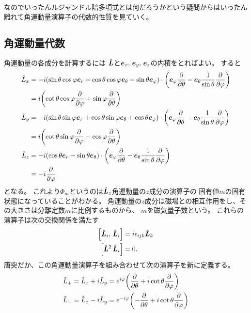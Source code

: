 \documentclass[../../master.tex]{subfiles}
\begin{document}
なのでいったんルジャンドル陪多項式とは何だろうかという疑問からはいったん離れて角運動量演算子の代数的性質を見ていく。

\subsection{角運動量代数}

角運動量の各成分を計算するには
\(\hat{\vb*{L}}\)と\(\vb*{e}_x,\,\vb*{e}_y,\,\vb*{e}_z\)の内積をとればよい。
すると
\begin{align}
	\hat{L}_x
	 & = -i(\sin\theta\cos\varphi \vb*{e}_r + \cos\theta\cos\varphi \vb*{e}_\theta - \sin\theta \vb*{e}_\varphi) \cdot
	\qty(\vb*{e}_{\varphi}\pdv{\theta}-\vb*{e}_{\theta}\frac{1}{\sin\theta}\pdv{\varphi}) \notag                       \\
	 & = i\qty(\cot\theta\cos\varphi\pdv{\varphi}+\sin\varphi\pdv{\theta})                                             \\
	\hat{L}_y
	 & = -i(\sin\theta\sin\varphi \vb*{e}_r + \cos\theta\sin\varphi \vb*{e}_\theta + \cos\theta \vb*{e}_\varphi) \cdot
	\qty(\vb*{e}_{\varphi}\pdv{\theta}-\vb*{e}_{\theta}\frac{1}{\sin\theta}\pdv{\varphi}) \notag                       \\
	 & = i\qty(\cot\theta\sin\varphi\pdv{\varphi}-\cos\varphi\pdv{\theta})                                             \\
	\hat{L}_z
	 & = -i(\cos\theta\vb*{e}_r -\sin\theta\vb*{e}_\theta) \cdot
	\qty(\vb*{e}_{\varphi}\pdv{\theta}-\vb*{e}_{\theta}\frac{1}{\sin\theta}\pdv{\varphi}) \notag                       \\
	 & = -i\pdv{\varphi}
\end{align}
となる。
これより\(\Phi_m\)というのは\(\hat{\vb*{L}}_z\)角運動量の\(z\)成分の演算子の
固有値\(m\)の固有状態になっていることがわかる。
角運動量の\(z\)成分は磁場との相互作用をし、その大きさは分離定数\(m\)に比例するものから、
\(m\)を磁気量子数という。
これらの演算子は次の交換関係を満たす
\begin{align}
	\qty[\hat{\vb*{L}}_i,\,\hat{\vb*{L}}_i] & = i\epsilon_{ijk}\hat{\vb*{L}}_k \\
	\qty[\hat{\vb*{L}}^2\,\hat{\vb*{L}}_i]  & =0.
\end{align}
唐突だか、この角運動量演算子を組み合わせて次の演算子を新に定義する。
\begin{align}
	\hat{L}_+ & = \hat{L}_x + i\hat{L}_y = e^{ i\varphi}\qty( \pdv{\theta} +i\cot\theta\pdv{\varphi}) \\
	\hat{L}_- & = \hat{L}_x - i\hat{L}_y = e^{-i\varphi}\qty(-\pdv{\theta} +i\cot\theta\pdv{\varphi})
\end{align}
\end{document}
